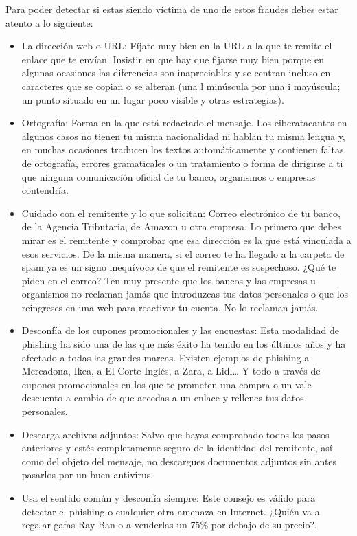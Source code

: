 \documentclass[
  spanish,
  a4paper,
  openany]{book}
\begin{document}
Para poder detectar si estas siendo víctima de uno de estos fraudes debes estar atento a lo siguiente:

\begin{itemize}
\item
  La dirección web o URL: Fíjate muy bien en la URL a la que te remite el enlace que te envían. Insistir en que hay que fijarse muy bien porque en algunas ocasiones las diferencias son inapreciables y se centran incluso en caracteres que se copian o se alteran (una l minúscula por una i mayúscula; un punto situado en un lugar poco visible y otras estrategias).
\item
  Ortografía: Forma en la que está redactado el mensaje. Los ciberatacantes en algunos casos no tienen tu misma nacionalidad ni hablan tu misma lengua y, en muchas ocasiones traducen los textos automáticamente y contienen faltas de ortografía, errores gramaticales o un tratamiento o forma de dirigirse a ti que ninguna comunicación oficial de tu banco, organismos o empresas contendría.
\item
  Cuidado con el remitente y lo que solicitan: Correo electrónico de tu banco, de la Agencia Tributaria, de Amazon u otra empresa. Lo primero que debes mirar es el remitente y comprobar que esa dirección es la que está vinculada a esos servicios. De la misma manera, si el correo te ha llegado a la carpeta de spam ya es un signo inequívoco de que el remitente es sospechoso. ¿Qué te piden en el correo? Ten muy presente que los bancos y las empresas u organismos no reclaman jamás que introduzcas tus datos personales o que los reingreses en una web para reactivar tu cuenta. No lo reclaman jamás.
\item
  Desconfía de los cupones promocionales y las encuestas: Esta modalidad de phishing ha sido una de las que más éxito ha tenido en los últimos años y ha afectado a todas las grandes marcas. Existen ejemplos de phishing a Mercadona, Ikea, a El Corte Inglés, a Zara, a Lidl\ldots{} Y todo a través de cupones promocionales en los que te prometen una compra o un vale descuento a cambio de que accedas a un enlace y rellenes tus datos personales.
\item
  Descarga archivos adjuntos: Salvo que hayas comprobado todos los pasos anteriores y estés completamente seguro de la identidad del remitente, así como del objeto del mensaje, no descargues documentos adjuntos sin antes pasarlos por un buen antivirus.
\item
  Usa el sentido común y desconfía siempre: Este consejo es válido para detectar el phishing o cualquier otra amenaza en Internet. ¿Quién va a regalar gafas Ray-Ban o a venderlas un 75\% por debajo de su precio?.
\end{itemize}
\end{document}
